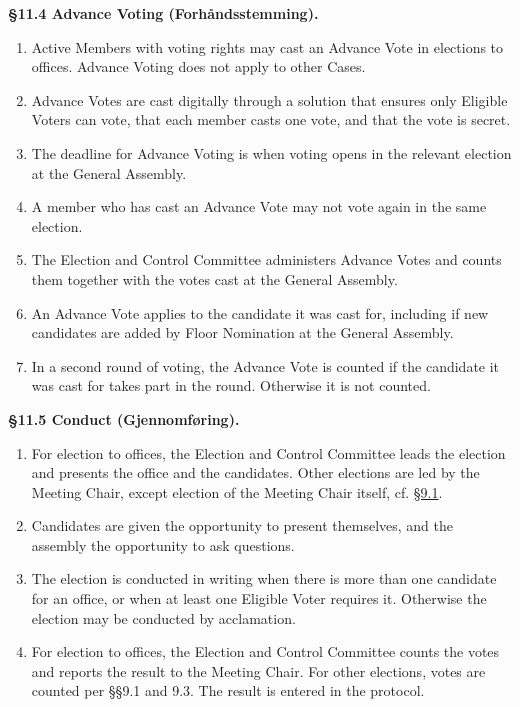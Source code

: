 \documentclass{../../../Common/Latex/Templates/rapport}
\begin{document}
\textbf{\S 11.4 Advance Voting (Forhåndsstemming).}\label{bylaw:11.4}
\begin{enumerate}
  \item Active Members with voting rights may cast an Advance Vote in elections to offices. Advance Voting does not apply to other Cases.
  \item Advance Votes are cast digitally through a solution that ensures only Eligible Voters can vote, that each member casts one vote, and that the vote is secret.
  \item The deadline for Advance Voting is when voting opens in the relevant election at the General Assembly.
  \item A member who has cast an Advance Vote may not vote again in the same election.
  \item The Election and Control Committee administers Advance Votes and counts them together with the votes cast at the General Assembly.
  \item An Advance Vote applies to the candidate it was cast for, including if new candidates are added by Floor Nomination at the General Assembly.
  \item In a second round of voting, the Advance Vote is counted if the candidate it was cast for takes part in the round. Otherwise it is not counted.
\end{enumerate}

\textbf{\S 11.5 Conduct (Gjennomføring).}\label{bylaw:11.5}
\begin{enumerate}
  \item For election to offices, the Election and Control Committee leads the election and presents the office and the candidates. Other elections are led by the Meeting Chair, except election of the Meeting Chair itself, cf. \hyperref[bylaw:9.1]{\S 9.1}.
  \item Candidates are given the opportunity to present themselves, and the assembly the opportunity to ask questions.
  \item The election is conducted in writing when there is more than one candidate for an office, or when at least one Eligible Voter requires it. Otherwise the election may be conducted by acclamation.
  \item For election to offices, the Election and Control Committee counts the votes and reports the result to the Meeting Chair. For other elections, votes are counted per \S\S9.1 and 9.3. The result is entered in the protocol.
\end{enumerate}
\end{document}
